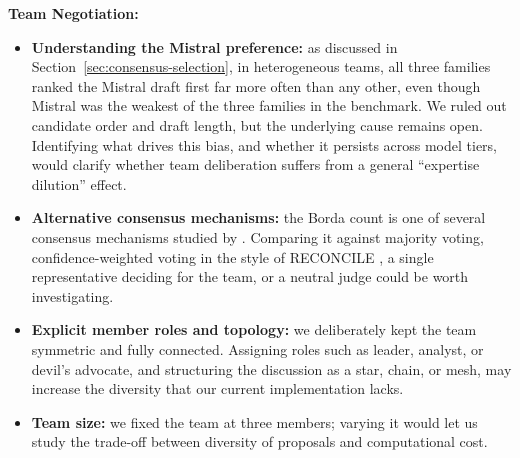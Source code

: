 \textbf{Team Negotiation:}
\begin{itemize}
    \item \textbf{Understanding the Mistral preference:} as discussed in Section~\ref{sec:consensus-selection}, in heterogeneous teams, all three families ranked the Mistral draft first far more often than any other, even though Mistral was the weakest of the three families in the benchmark. We ruled out candidate order and draft length, but the underlying cause remains open. Identifying what drives this bias, and whether it persists across model tiers, would clarify whether team deliberation suffers from a general ``expertise dilution'' effect.
    \item \textbf{Alternative consensus mechanisms:} the Borda count is one of several consensus mechanisms studied by \textcite{S_nchez_Anguix_2013}. Comparing it against majority voting, confidence-weighted voting in the style of RECONCILE \parencite{chen2024reconcileroundtableconferenceimproves}, a single representative deciding for the team, or a neutral judge could be worth investigating.
    \item \textbf{Explicit member roles and topology:} we deliberately kept the team symmetric and fully connected. Assigning roles such as leader, analyst, or devil's advocate, and structuring the discussion as a star, chain, or mesh, may increase the diversity that our current implementation lacks.
    \item \textbf{Team size:} we fixed the team at three members; varying it would let us study the trade-off between diversity of proposals and computational cost.
\end{itemize}